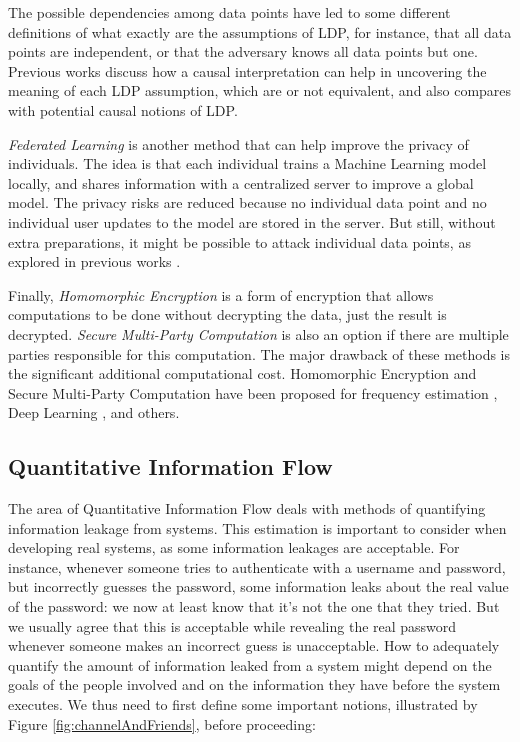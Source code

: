 \documentclass[conference]{IEEEtran}
\begin{document}
The possible dependencies among data points have led to some different definitions of what exactly are the assumptions of LDP, for instance, that all data points are independent, or that the adversary knows all data points but one. Previous works \cite{tschantz2020sok} discuss how a causal interpretation can help in uncovering the meaning of each LDP assumption, which are or not equivalent, and also compares with potential causal notions of LDP.

\emph{Federated Learning} is another method that can help improve the privacy of individuals. The idea is that each individual trains a Machine Learning model locally, and shares information with a centralized server to improve a global model. The privacy risks are reduced because no individual data point and no individual user updates to the model are stored in the server. But still, without extra preparations, it might be possible to attack individual data points, as explored in previous works \cite{wang2019beyond}.

Finally, \emph{Homomorphic Encryption} is a form of encryption that allows computations to be done without decrypting the data, just the result is decrypted. \emph{Secure Multi-Party Computation} is also an option if there are multiple parties responsible for this computation. The major drawback of these methods is the significant additional computational cost. Homomorphic Encryption and Secure Multi-Party Computation have been proposed for frequency estimation \cite{yang2005privacy}, Deep Learning \cite{hesamifard2017cryptodl}\cite{goswami2024privacy}, and others.


\subsection{Quantitative Information Flow}

The area of Quantitative Information Flow deals with methods of quantifying information leakage from systems. This estimation is important to consider when developing real systems, as some information leakages are acceptable. For instance, whenever someone tries to authenticate with a username and password, but incorrectly guesses the password, some information leaks about the real value of the password: we now at least know that it's not the one that they tried. But we usually agree that this is acceptable while revealing the real password whenever someone makes an incorrect guess is unacceptable. How to adequately quantify the amount of information leaked from a system might depend on the goals of the people involved and on the information they have before the system executes. We thus need to first define some important notions, illustrated by Figure \ref{fig:channelAndFriends}, before proceeding:
\end{document}
